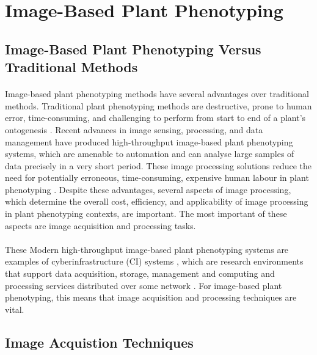 \section{Image-Based Plant Phenotyping}

\subsection{Image-Based Plant Phenotyping Versus Traditional Methods} 
\paragraph{}
Image-based plant phenotyping methods have several advantages over traditional methods. Traditional plant phenotyping methods are destructive, prone to human error, time-consuming, and challenging to perform from start to end of a plant's ontogenesis \cite{arnalbarbedoDigitalImageProcessing2013, zhangHighthroughputPhenotypingPlant2023, laxmanNoninvasiveQuantificationTomato2018}. Recent advances in image sensing, processing, and data management have produced high-throughput image-based plant phenotyping systems, which are amenable to automation and can analyse large samples of data precisely in a very short period. These image processing solutions reduce the need for potentially erroneous, time-consuming, expensive human labour in plant phenotyping \cite{daschoudhuryLeveragingImageAnalysis2019}. Despite these advantages, several aspects of image processing, which determine the overall cost, efficiency, and applicability of image processing in plant phenotyping contexts, are important. The most important of these aspects are image acquisition and processing tasks.
 
 \paragraph{}
 These Modern high-throughput image-based plant phenotyping systems are examples of cyberinfrastructure (CI) systems \cite{abebeImageBasedHighThroughputPhenotyping2023}, which are research environments that support data acquisition, storage, management and computing and processing services distributed over some network \cite{nabwireReviewApplicationArtificial2021}. For image-based plant phenotyping, this means that image acquisition and processing techniques are vital.
  
\subsection{Image Acquistion Techniques}

